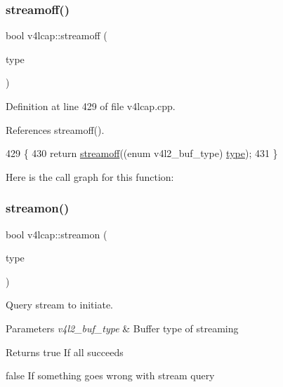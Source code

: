 \subsubsection{\texorpdfstring{streamoff()}{streamoff()}\hspace{0.1cm}{\footnotesize\ttfamily [2/2]}}
{\footnotesize\ttfamily bool v4lcap\+::streamoff (\begin{DoxyParamCaption}\item[{int}]{type }\end{DoxyParamCaption})}



Definition at line 429 of file v4lcap.\+cpp.



References streamoff().


\begin{DoxyCode}
429                                \{
430     \textcolor{keywordflow}{return} \hyperlink{classv4lcap_ae15aa5107e993df45eb358a842d97e55}{streamoff}((\textcolor{keyword}{enum} v4l2\_buf\_type) \hyperlink{classstd_1_1conditional_1_1type}{type});
431 \}
\end{DoxyCode}
Here is the call graph for this function\+:
\mbox{\label{classv4lcap_abb1f77b86c0368cd40dab1fb8d4a2565}} 
\subsubsection{\texorpdfstring{streamon()}{streamon()}\hspace{0.1cm}{\footnotesize\ttfamily [1/2]}}
{\footnotesize\ttfamily bool v4lcap\+::streamon (\begin{DoxyParamCaption}\item[{enum v4l2\+\_\+buf\+\_\+type}]{type }\end{DoxyParamCaption})}



Query stream to initiate. 


\begin{DoxyParams}{Parameters}
{\em v4l2\+\_\+buf\+\_\+type} & Buffer type of streaming \\
\hline
\end{DoxyParams}
\begin{DoxyReturn}{Returns}
true If all succeeds 

false If something goes wrong with stream query 
\end{DoxyReturn}


